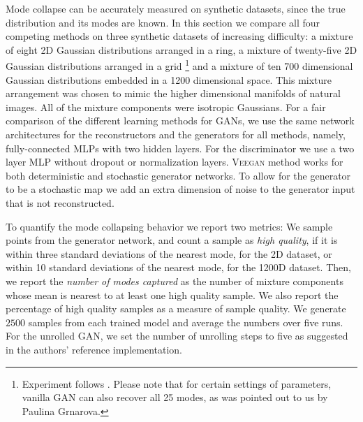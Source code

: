 \documentclass{article}
\newcommand{\acronym}{\textsc{Veegan}\xspace}
\begin{document}
Mode collapse can be accurately measured on synthetic datasets, since the true  distribution and its modes are known. 
In this section we compare all four competing methods on three synthetic datasets of increasing difficulty: 
a mixture of eight 2D Gaussian distributions arranged in a ring, a mixture of twenty-five 
2D Gaussian distributions arranged in a grid \footnote{Experiment follows \cite{ali2016}. Please note that for certain settings of parameters, vanilla GAN can also recover all 25 modes, as was pointed out to us by Paulina Grnarova.} and a mixture of ten 
700 dimensional Gaussian distributions embedded in a 1200 dimensional space.  This mixture arrangement was chosen to mimic the higher dimensional manifolds of natural images.
All of the mixture components were isotropic Gaussians.
For a fair comparison of the different learning methods
for GANs, we use the same 
network architectures for the reconstructors and the generators for all methods,
namely, fully-connected MLPs with two hidden layers. For the discriminator we use a two layer MLP without  dropout or normalization layers. \acronym method works for both deterministic and stochastic generator networks. To allow for the generator to be a stochastic map we add an extra dimension of noise to the generator input that is not reconstructed. 

To quantify the mode collapsing behavior we report two metrics:  We sample points from the generator network, and count
a sample as \emph{high quality},
if it is within three standard deviations of the nearest mode, 
for the 2D dataset, or within 10 standard deviations of the nearest mode, for the 1200D dataset.
Then, we report the \emph{number of modes captured} as the number
of mixture components whose mean is nearest to at least
one high quality sample.
We also report the percentage of high quality samples
as a measure of sample quality. We generate $2500$ samples from each trained model and average the numbers over five runs. 
For the unrolled GAN, we set the number of unrolling steps to five as suggested in the authors' reference implementation.
\end{document}
